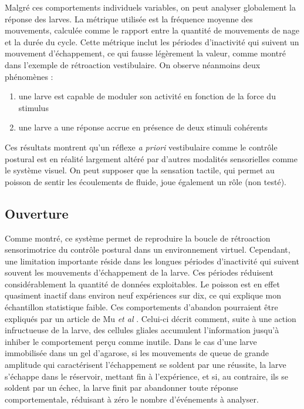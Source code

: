 Malgré ces comportements individuels variables, on peut analyser globalement la réponse des larves. La métrique utilisée est la fréquence moyenne des mouvements, calculée comme le rapport entre la quantité de mouvements de nage et la durée du cycle. Cette métrique inclut les périodes d'inactivité qui suivent un mouvement d'échappement, ce qui fausse légèrement la valeur, comme montré dans l'exemple de rétroaction vestibulaire. On observe néanmoins deux phénomènes :

\begin{enumerate}
    \item une larve est capable de moduler son activité en fonction de la force du stimulus
    \item une larve a une réponse accrue en présence de deux stimuli cohérents
\end{enumerate}

Ces résultats montrent qu'un réflexe \emph{a priori} vestibulaire comme le contrôle postural est en réalité largement altéré par d'autres modalités sensorielles comme le système visuel. On peut supposer que la sensation tactile, qui permet au poisson de sentir les écoulements de fluide, joue également un rôle (non testé). 

\subsection{Ouverture}

Comme montré, ce système permet de reproduire la boucle de rétroaction sensorimotrice du contrôle postural dans un environnement virtuel. Cependant, une limitation importante réside dans les longues périodes d'inactivité qui suivent souvent les mouvements d'échappement de la larve. 
Ces périodes réduisent considérablement la quantité de données exploitables. Le poisson est en effet quasiment inactif dans environ neuf expériences sur dix, ce qui explique mon échantillon statistique faible.
Ces comportements d'abandon pourraient être expliqués par un article de Mu \emph{et al} \cite{mu_glia_2019}. Celui-ci décrit comment, suite à une action infructueuse de la larve, des cellules gliales accumulent l'information jusqu'à inhiber le comportement perçu comme inutile.
Dans le cas d'une larve immobilisée dans un gel d'agarose, si les mouvements de queue de grande amplitude qui caractérisent l'échappement se soldent par une réussite, la larve s'échappe dans le réservoir, mettant fin à l'expérience, et si, au contraire, ils se soldent par un échec, la larve finit par abandonner toute réponse comportementale, réduisant à zéro le nombre d'événements à analyser.

